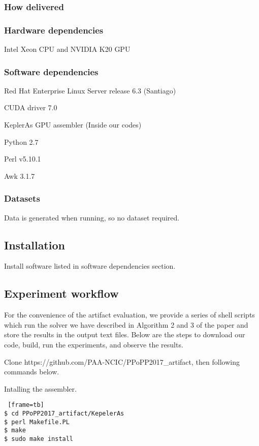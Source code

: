 \subsubsection{How delivered}


\subsubsection{Hardware dependencies}
Intel Xeon CPU and NVIDIA K20 GPU
\subsubsection{Software dependencies}
Red Hat Enterprise Linux Server release 6.3 (Santiago)

CUDA driver 7.0

KeplerAs GPU assembler (Inside our codes)

Python 2.7

Perl v5.10.1

Awk 3.1.7

\subsubsection{Datasets}
Data is generated when running, so no dataset required.
\subsection{Installation}
Install software listed in software dependencies section.


\subsection{Experiment workflow}
For the convenience of the artifact evaluation, we provide a series
of shell scripts which run the solver  we have described in Algorithm 2 and 3 of the paper and store the results in the output text files. Below are the steps to download our code, build, run the experiments, and observe the results.

Clone https://github.com/PAA-NCIC/PPoPP2017\_artifact, then following commands below.

Intalling the assembler.
\begin{lstlisting} [frame=tb]
$ cd PPoPP2017_artifact/KepelerAs
$ perl Makefile.PL
$ make
$ sudo make install
\end{lstlisting}

